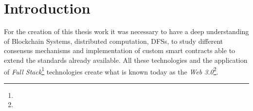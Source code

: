 \section{Introduction}
\label{ch:approach:intro}
For the creation of this thesis work it was necessary to have a deep understanding of Blockchain Systems, distributed computation, \ac{DFS}s, to study different consensus mechanisms and implementation of custom smart contracts able to extend the standards already available. All these technologies and the application of \emph{Full Stack}\footnote{} technologies
create what is known today as the \emph{Web 3.0}\footnote{}.
